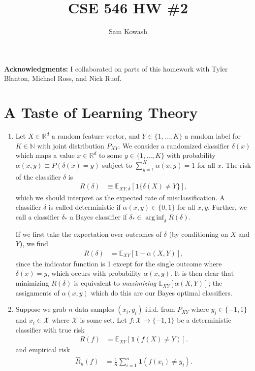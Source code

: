 \documentclass[11pt,letterpaper]{article}
\author{Sam Kowash}
\title{CSE 546 HW \#2}
\DeclareMathOperator*{\arginf}{arg\,inf}
\numberwithin{equation}{section}
\numberwithin{figure}{section}
\begin{document}
\maketitle

{\bf Acknowledgments:} I collaborated on parts of this homework with Tyler Blanton, Michael Ross, and Nick Ruof.

\section{A Taste of Learning Theory}
\begin{enumerate}
	\item Let $X \in \mathbb{R}^d$ a random feature vector, and $Y \in \{1,\ldots,K\}$ a random label for $K\in \mathbb{N}$ with joint distribution $P_{XY}$. We consider a randomized classifier $\delta(x)$ which maps a value $x\in\mathbb{R}^d$ to some $y \in \{1,\ldots,K\}$ with probability $\alpha(x,y) \equiv P(\delta(x)=y)$ subject to $\sum_{y=1}^K \alpha(x,y) = 1$ for all $x$. The risk of the classifier $\delta$ is
	\begin{align*}
		R(\delta) &\equiv \mathbb{E}_{XY,\delta}\left[\bm{1}\{\delta(X) \neq Y\}\right],
	\end{align*}
	which we should interpret as the expected rate of misclassification. A classifier $\delta$ is called deterministic if $\alpha(x,y) \in \{0,1\}$ for all $x,y$. Further, we call a classifier $\delta_\ast$ a Bayes classifier if $\delta_\ast \in \arginf_\delta R(\delta)$.

	If we first take the expectation over outcomes of $\delta$ (by conditioning on $X$ and $Y$), we find
	\begin{align*}
		R(\delta) &= \mathbb{E}_{XY}\left[1-\alpha(X,Y)\right],
	\end{align*}
	since the indicator function is 1 except for the single outcome where $\delta(x)=y$, which occurs with probability $\alpha(x,y)$. It is then clear that minimizing $R(\delta)$ is equivalent to \emph{maximizing} $\mathbb{E}_{XY}[\alpha(X,Y)]$; the assignments of $\alpha(x,y)$ which do this are our Bayes optimal classifiers. 

















	\item Suppose we grab $n$ data samples $(x_i,y_i)$ i.i.d. from $P_{XY}$ where $y_i \in \{-1,1\}$ and $x_i \in \mathcal{X}$ where $\mathcal{X}$ is some set. Let $f: \mathcal{X} \to \{-1,1\}$ be a deterministic classifier with true risk
	\begin{align*}
		R(f) &= \mathbb{E}_{XY}\left[\bm{1}(f(X) \neq Y)\right].
	\end{align*}
	and empirical risk
	\begin{align*}
		\hat{R}_n(f) &= \frac{1}{n} \sum_{i=1}^n \bm{1}(f(x_i) \neq y_i).
	\end{align*}





\end{enumerate}
\end{document}
